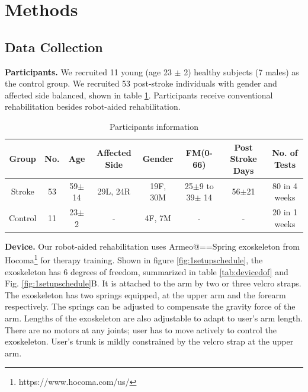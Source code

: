 \section{Methods}

\subsection{Data Collection}

\textbf{Participants.} 
We recruited 11 young (age 23 $\pm$ 2) healthy subjects (7 males) as the control group.
We recruited 53 post-stroke individuals with gender and affected side balanced, shown in table \ref{tab:demog}. 
Participants receive conventional rehabilitation besides robot-aided rehabilitation.

\begin{table}[b]
	\begin{tabular}{c c c c c c c c}
		\hline
		Group & No. & Age & Affected Side & Gender & FM(0-66) & Post Stroke Days & No. of Tests\\
		\hline
		Stroke & 53 & 59$\pm$14 & 29L, 24R & 19F, 30M & 25$\pm$9 to 39$\pm$ 14 & 56$\pm$21 & 80 in 4 weeks \\ 
		Control & 11 & 23$\pm$2 & - & 4F, 7M & - & - & 20 in 1 weeks \\
		\hline
	\end{tabular}
	\caption{Participants information}
	\label{tab:demog}
\end{table}

\textbf{Device.}
Our robot-aided rehabilitation uses Armeo@==Spring exoskeleton from Hocoma\footnote{https://www.hocoma.com/us/} for therapy training. 
Shown in figure \ref{fig:1setupschedule}, the exoskeleton has 6 degrees of freedom, summarized in table \ref{tab:devicedof} and Fig. \ref{fig:1setupschedule}B. 
It is attached to the arm by two or three velcro straps. 
The exoskeleton has two springs equipped, at the upper arm and the forearm respectively. 
The springs can be adjusted to compensate the gravity force of the arm. 
Lengths of the exoskeleton are also adjustable to adapt to user's arm length.
There are no motors at any joints; user has to move actively to control the exoskeleton. 
User's trunk is mildly constrained by the velcro strap at the upper arm.


